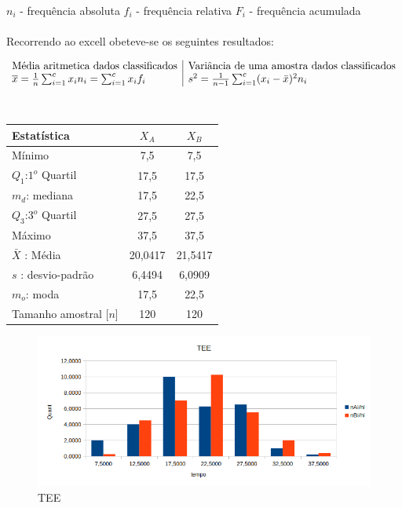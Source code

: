 \\
$n_i$ - frequência absoluta \quad
$f_i$ - frequência relativa \quad
$F_i$ - frequência acumulada \quad
\\
\\
Recorrendo ao excell obeteve-se os seguintes resultados: \\
\begin{minipage}{0pt}
$$\begin{array}{l | l}
\text{Média aritmetica dados classificados} & \text{Variância de uma amostra dados classificados} \\
\overline{x} = \frac{1}{n}\sum_{i=1}^cx_in_i = \sum_{i=1}^cx_if_i & s^2 = \frac{1}{n-1}\sum_{i=1}^c (x_i-\bar{x})^2 n_i
\end{array}$$
\end{minipage}
\\
\begin{minipage}[!b]{0.40\linewidth}
\begin{tabular}{ l c c }
\hline
Estatística & $X_A$ & $X_B$ \\
\hline
Mínimo & 7,5 & 7,5\\
$Q_1$:$1^o$ Quartil & 17,5 & 17,5 \\
$m_d$: mediana & 17,5 & 22,5\\
$Q_3$:$3^o$ Quartil & 27,5 & 27,5 \\
Máximo & 37,5 & 37,5 \\
\hline
$\bar{X}$ : Média & 20,0417 & 21,5417 \\
$s$ : desvio-padrão & 6,4494 & 6,0909\\
$m_o$: moda & 17,5 & 22,5\\
\hline
Tamanho amostral [$n$] & 120 & 120 \\
\hline
\end{tabular}
\label{Tab:Resulatdos}
\end{minipage}
\hspace{2cm}
\begin{minipage}[!b]{0.40\linewidth}
\begin{figure}[H]
\centering
\includegraphics[scale=0.5]{./image/TEE.png}
\caption{TEE}
\label{TEE}
\end{figure}
\end{minipage}

